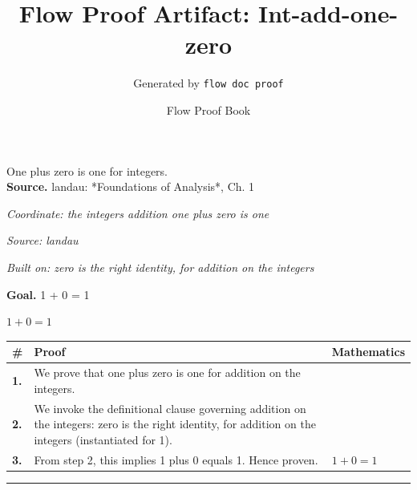 \documentclass[11pt]{article}
\title{Flow Proof Artifact: Int-add-one-zero}
\author{Generated by \texttt{flow doc proof}}
\date{Flow Proof Book}
\theoremstyle{definition}
\begin{document}
\maketitle
One plus zero is one for integers.\\[0.5em]
\textbf{Source.} landau: *Foundations of Analysis*, Ch. 1\\[0.5em]
\bigskip
{}\par
\smallskip\noindent\textit{Coordinate: the integers \cdot addition \cdot one plus zero is one}\par
\smallskip\noindent\textit{Source: landau}\par
\smallskip\noindent\textit{Built on: zero is the right identity, for addition on the integers}\par
\medskip
\noindent\textbf{Goal.} 1 + 0 = 1\par
\noindent$\displaystyle 1 + 0 = 1$\par
\medskip
\noindent
\begin{tabular}{@{} >{\raggedright\arraybackslash}p{} >{\raggedright\arraybackslash}p{} >{\raggedleft\arraybackslash}p{} @{}}
\textbf{\#} & \textbf{Proof} & \textbf{Mathematics} \\
\midrule
\textbf{1.} & We prove that one plus zero is one for addition on the integers. & \\[0.45em]
\textbf{2.} & We invoke the definitional clause governing addition on the integers: zero is the right identity, for addition on the integers (instantiated for 1). & \\[0.45em]
\textbf{3.} & From step 2, this implies 1 plus 0 equals 1. Hence proven. & $\displaystyle 1 + 0 = 1$ \\[0.45em]
\bottomrule
\end{tabular}
\label{thm:Int-addition-one_plus_zero_is_one}
\par\medskip\hrule
\end{document}
